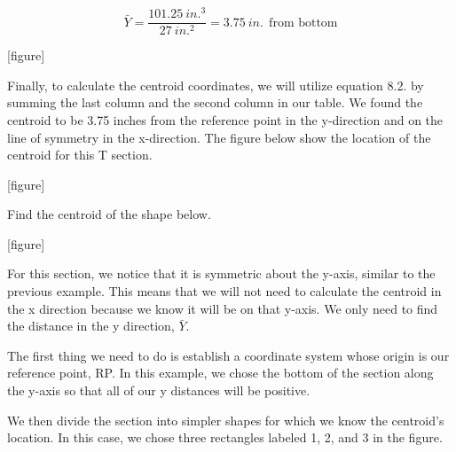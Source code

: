 \documentclass[
  letterpaper,
  DIV=11,
  numbers=noendperiod]{scrreprt}
\begin{document}
\begin{tcolorbox}
\begin{tcolorbox}
\[
\bar{Y}=\frac{101.25{~in.^3}}{27{~in.^2}}=3.75{~in.} ~~\text{from bottom}
\]

{[}figure{]}

Finally, to calculate the centroid coordinates, we will utilize equation
8.2. by summing the last column and the second column in our table. We
found the centroid to be 3.75 inches from the reference point in the
y-direction and on the line of symmetry in the x-direction. The figure
below show the location of the centroid for this T section.

{[}figure{]}

\end{tcolorbox}

\end{tcolorbox}

\begin{tcolorbox}[enhanced jigsaw, breakable, opacityback=0, toptitle=1mm, left=2mm, colback=white, opacitybacktitle=0.6, colframe=quarto-callout-note-color-frame, titlerule=0mm, arc=.35mm, leftrule=.75mm, bottomtitle=1mm, colbacktitle=quarto-callout-note-color!10!white, rightrule=.15mm, title={Example 8.2}, bottomrule=.15mm, toprule=.15mm, coltitle=black]

Find the centroid of the shape below.

{[}figure{]}

\begin{tcolorbox}[enhanced jigsaw, breakable, opacityback=0, toptitle=1mm, left=2mm, colback=white, opacitybacktitle=0.6, colframe=quarto-callout-note-color-frame, titlerule=0mm, arc=.35mm, leftrule=.75mm, bottomtitle=1mm, colbacktitle=quarto-callout-note-color!10!white, rightrule=.15mm, title={Solution}, bottomrule=.15mm, toprule=.15mm, coltitle=black]

For this section, we notice that it is symmetric about the y-axis,
similar to the previous example. This means that we will not need to
calculate the centroid in the x direction because we know it will be on
that y-axis. We only need to find the distance in the y direction,
\(\bar{Y}\).

The first thing we need to do is establish a coordinate system whose
origin is our reference point, RP. In this example, we chose the bottom
of the section along the y-axis so that all of our y distances will be
positive.

We then divide the section into simpler shapes for which we know the
centroid's location. In this case, we chose three rectangles labeled 1,
2, and 3 in the figure.


\end{tcolorbox}
\end{tcolorbox}
\end{document}
